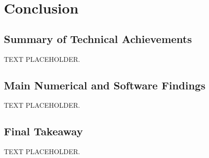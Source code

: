 \chapter{Conclusion}

\section{Summary of Technical Achievements}

TEXT PLACEHOLDER.

\section{Main Numerical and Software Findings}

TEXT PLACEHOLDER.

\section{Final Takeaway}

TEXT PLACEHOLDER.
